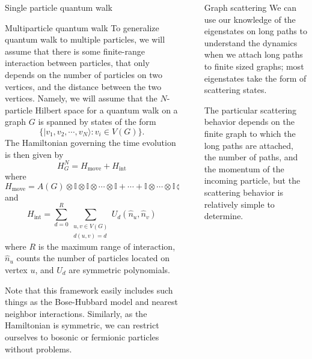 \documentclass{beamer}
\newlength{\sepwid}
\newlength{\onecolwid}
\newcommand{\sket}[1]{|{#1}\rangle}
\newcommand{\II}{\mathbb{I}}
\begin{document}
\begin{frame}[t]
\begin{columns}[t]
\begin{column}{\onecolwid}
\begin{block}{Single particle quantum walk}
    

    
  \end{block}


  \begin{block}{Multiparticle quantum walk}
    To generalize quantum walk to multiple particles, we will assume that there is some finite-range interaction between particles, that only depends on the number of particles on two vertices, and the distance between the two vertices.  Namely, we will assume that the $N$-particle Hilbert space for a quantum walk on a graph $G$ is spanned by states of the form
    \[
      \big\{\sket{v_1,v_2,\cdots,v_N}: v_i\in V(G)\big\}.
    \]
    The Hamiltonian governing the time evolution is then given by
    \[
      H_G^N = H_{\text{move}} + H_{\text{int}}
    \]
    where
    \[
      H_{\text{move}} = A(G)\otimes \II\otimes \II \otimes \cdots \otimes \II + \cdots + \II \otimes \cdots\otimes \II \otimes A(G)
    \]
    and
    \[
      H_{\text{int}} = \sum_{d=0}^{R} \sum_{\substack{u,v\in V(G)\\d(u,v)=d}} U_{d}(\hat{n}_u,\hat{n}_v)
    \]
    where $R$ is the maximum range of interaction, $\hat{n}_u$ counts the number of particles located on vertex $u$, and $U_d$ are symmetric polynomials.

    Note that this framework easily includes such things as the Bose-Hubbard model and nearest neighbor interactions.  Similarly, as the Hamiltonian is symmetric, we can restrict ourselves to bosonic or fermionic particles without problems.
    
    
  \end{block}

\end{column}

\begin{column}{\sepwid}\end{column}

\begin{column}{\onecolwid}
  \begin{block}{Graph scattering}
    We can use our knowledge of the eigenstates on long paths to understand the dynamics when we attach long paths to finite sized graphs; most eigenstates take the form of scattering states.
    
    The particular scattering behavior depends on the finite graph to which the long paths are attached, the number of paths, and the momentum of the incoming particle, but the scattering behavior is relatively simple to determine.
    

\end{block}
\end{column}
\end{columns}
\end{frame}
\end{document}
